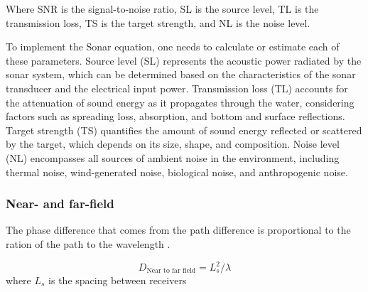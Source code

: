 Where
SNR is the signal-to-noise ratio,
SL is the source level,
TL is the transmission loss,
TS is the target strength, and
NL is the noise level.

To implement the Sonar equation, one needs to calculate or estimate each of these parameters. 
Source level (SL) represents the acoustic power radiated by the sonar system, which can be determined based on the characteristics of the sonar transducer and the electrical input power. 
Transmission loss (TL) accounts for the attenuation of sound energy as it propagates through the water, considering factors such as spreading loss, absorption, and bottom and surface reflections. 
Target strength (TS) quantifies the amount of sound energy reflected or scattered by the target, which depends on its size, shape, and composition. 
Noise level (NL) encompasses all sources of ambient noise in the environment, including thermal noise, wind-generated noise, biological noise, and anthropogenic noise.


\subsubsection{Near- and far-field}
The phase difference that comes from the path difference is proportional to the ration of the path to the wavelength \cite[p.30]{leighton_acoustic_2012}.

\[D_\text{Near to far field} = L_s^2/\lambda\] 
where $L_s$ is the spacing between receivers
